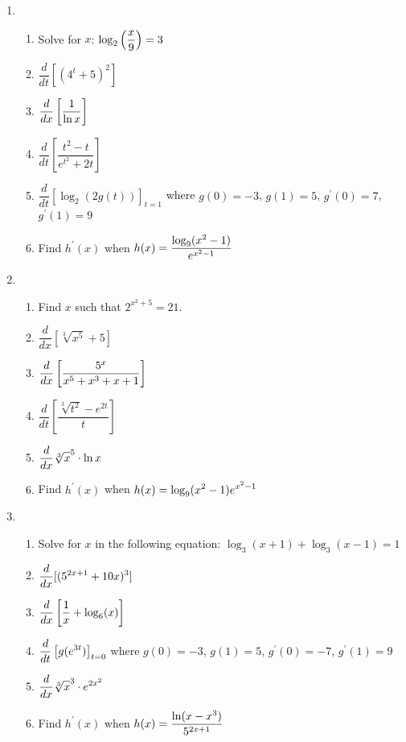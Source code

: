 \documentclass[10pt]{article}
\begin{document}
\begin{enumerate}

\item[Board 1.] \, 
    \begin{enumerate}
    \item Solve for $x$: $\displaystyle \log_2\left(\frac{x}{9}\right)=3$
    \item $\dfrac{d}{dt}[ (4^t + 5)^2]$
    \item $\displaystyle \dfrac{d}{dx}\left[\frac{1}{\ln x}\right]$
    \item $\dfrac{d}{dt}\left[\dfrac{t^2-t}{e^{t^2}+2t}\right]$
    \item $\dfrac{d}{dt}\left[\log_2(2g(t))\right]_{t=1}$ where $g(0)=-3$, $g(1)=5$, $g^{\prime}(0)= 7$, $g^{\prime}(1)= 9$ 
     \item Find $h^{\prime}(x)$ when $\displaystyle h(x)=\frac{\log_9(x^2-1)}{e^{x^2-1}}$
    \end{enumerate}
\newpage%
\item[Board 2.] \,  
    \begin{enumerate}
    \item Find $x$ such that $2^{x^2+5}=21$.
    \item $\dfrac{d}{dx} \left[ \sqrt[3]{x^5} + 5\right]$
    \item $\displaystyle \dfrac{d}{dx}\left[ \frac{5^x}{x^5 + x^3 + x + 1}\right]$
    \item $\dfrac{d}{dt}\left[\dfrac{\sqrt[3]{t^2}- e^{2t}}{t}\right]$
    \item $\displaystyle \frac{d}{dx} \sqrt[3] x^5 \cdot \ln x$
     \item Find $h^{\prime}(x)$ when $\displaystyle h(x)=\log_9(x^2-1)e^{x^2-1}$
    \end{enumerate}
\newpage%
\item[Board 3.] \,  
    \begin{enumerate}
    \item Solve for $x$ in the following equation: $\log_3(x+1)+\log_3(x-1)=1$
    \item $\displaystyle \dfrac{d}{dx}[(5^{2x+1} + 10x)^3]$
    \item $\displaystyle \dfrac{d}{dx}\left[\frac{1}{x} + \log_6( x)\right]$
    \item $\displaystyle \dfrac{d}{dt}\left[ g(e^{3t})\right]_{t=0}$  where $g(0)=-3$, $g(1)=5$, $g^{\prime}(0)= -7$, $g^{\prime}(1)= 9$ 
    \item $\displaystyle \frac{d}{dx} \sqrt[3]x^3 \cdot e^{2x^2}$
      \item Find $h^{\prime}(x)$ when $\displaystyle h(x)=\frac{\ln(x-x^3)}{5^{2x+1}}$
    \end{enumerate}

\end{enumerate}
\end{document}
